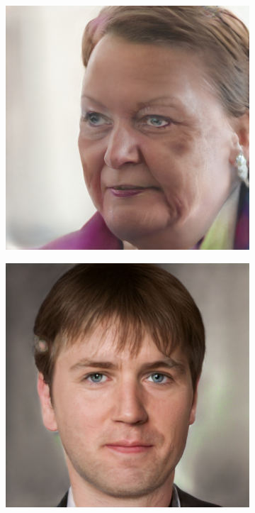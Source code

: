 \begin{figure}[h!]
\begin{subfigure}[b]{0.24\textwidth}
    \end{subfigure}
    \begin{subfigure}[b]{0.24\textwidth}
        \includegraphics[width=\textwidth]{fig/stylegan/faceedit/lars-gender}

    \end{subfigure}
    \begin{subfigure}[b]{0.24\textwidth}
        \includegraphics[width=\textwidth]{fig/stylegan/faceedit/mette-gender}


\end{subfigure}
\end{figure}
